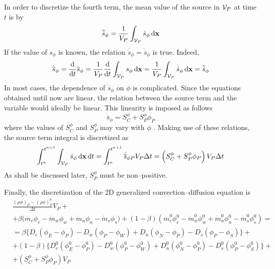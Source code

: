 In order to discretize the fourth term, the mean value of the source in $\mathcal{V}_{P}$ at time $t$ is by
\begin{equation}
	\overline{\dot{s}}_\phi = 
	\frac{1}{V_P} \int_{\mathcal{V}_{P}} \dot{s}_\phi \dd{\vb{x}}
\end{equation}
If the value of $s_\phi$ is known, the relation $\overline{\dot{s}}_\phi = \dot{\overline{s}}_\phi$ is true. Indeed,
\begin{equation}
	\dot{\overline{s}}_\phi = 
	\frac{\dd}{\dd{t}} \overline{s}_\phi = 
	\frac{1}{V_P} \frac{\dd}{\dd{t}} \int_{\mathcal{V}_{P}} s_\phi \dd{\vb{x}} = 
	\frac{1}{V_P} \int_{\mathcal{V}_{P}} \dot{s}_\phi \dd{\vb{x}} = 
	\overline{\dot{s}}_\phi
\end{equation}
In most cases, the dependence of $\dot{\overline{s}}_\phi$ on $\phi$ is complicated. Since the equations obtained until now are linear, the relation between the source term and the variable would ideally be linear. This linearity is imposed as follows
\begin{equation}
	\dot{\overline{s}}_\phi = S_C^\phi + S_P^\phi \phi_P
\end{equation}
where the values of $S_C^\phi$ and $S_P^\phi$ may vary with $\phi$ \cite{patankar2008numerical}. Making use of these relations, the source term integral is discretized as
\begin{equation}
	\int_{t^n}^{t^{n+1}} \int_{\mathcal{V}_{P}} \dot{s}_\phi \dd{\vb{x}} \dd{t} = 
	\int_{t^n}^{t^{n+1}} 
	\dot{\overline{s}}_{\phi P} V_P \Delta t = 
	\left( S_C^\phi + S_P^\phi \phi_P \right) V_P \Delta t
\end{equation}
As shall be discussed later, $S_P^\phi$ must be non--positive.

Finally, the discretization of the 2D generalized convection--diffusion equation is
\begin{align}
	&\frac{(\rho \phi)_P - (\rho \phi)_P^0}{\Delta t} V_P + \nonumber \\
	&+ 
	\beta 
	\Big( \dot{m}_e \phi_e - \dot{m}_w \phi_w + \dot{m}_n \phi_n - \dot{m}_s \phi_s \Big) + 
	(1 - \beta) 
	\left( \dot{m}_e^0 \phi_e^0 - \dot{m}_w^0 \phi_w^0 + \dot{m}_n^0 \phi_n^0 - \dot{m}_s^0 \phi_s^0 \right) =  \nonumber \\
	&= 
	\beta 
	\Big\{ 
	D_e (\phi_E - \phi_P) - D_w (\phi_P - \phi_W) + D_n (\phi_N - \phi_P) - D_s (\phi_P - \phi_S) 
	\Big\} + \nonumber \\
	&+ (1 - \beta)
	\Big\{ 
	D_e^0 (\phi_E^0 - \phi_P^0) - D_w^0 (\phi_P^0 - \phi_W^0) + 
	D_n^0 (\phi_N^0 - \phi_P^0) - D_s^0 (\phi_P^0 - \phi_S^0)
	\Big\} + \nonumber \\
	&+ \left( S_C^\phi + S_P^\phi \phi_P \right) V_P
\end{align}


